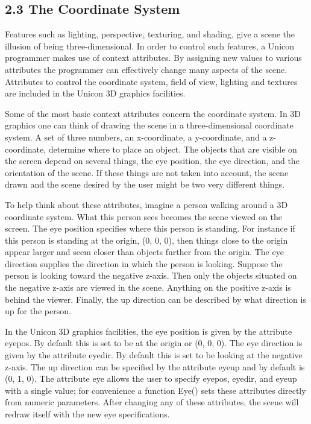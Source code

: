 \documentclass[letterpaper]{article}
\begin{document}
\subsection[2.3 The Coordinate System]
{2.3 The Coordinate System}

{
Features such as lighting, perspective, texturing, and shading, give a scene the illusion of being three-dimensional. In
order to control such features, a Unicon programmer makes use of context attributes. By assigning new values to various
attributes the programmer can effectively change many aspects of the scene. Attributes to control the coordinate
system, field of view, lighting and textures are included in the Unicon 3D graphics facilities. }

{
Some of the most basic context attributes concern the coordinate system. In 3D graphics one can think of drawing the
scene in a three-dimensional coordinate system. A set of three numbers, an x-coordinate, a y-coordinate, and a
z-coordinate, determine where to place an object. The objects that are visible on the screen depend on several things,
the eye position, the eye direction, and the orientation of the scene. If these things are not taken into account, the
scene drawn and the scene desired by the user might be two very different things. }

{
To help think about these attributes, imagine a person walking around a 3D coordinate system. What this person sees
becomes the scene viewed on the screen. The eye position specifies where this person is standing. For instance if this
person is standing at the origin, \textsf{(0, 0, 0),} then things close to the origin appear larger and seem closer
than objects further from the origin. The eye direction supplies the direction in which the person is looking. Suppose
the person is looking toward the negative z-axis. Then only the objects situated on the negative z-axis are viewed in
the scene. Anything on the positive z-axis is behind the viewer. Finally, the up direction can be described by what
direction is up for the person. }

{
In the Unicon 3D graphics facilities, the eye position is given by the attribute \textsf{eyepos}. By default this is set
to be at the origin or \textsf{(0, 0, 0)}. The eye direction is given by the attribute \textsf{eyedir}. By default this
is set to be looking at the negative z-axis. The up direction can be specified by the attribute \textsf{eyeup} and by
default is \textsf{(0, 1, 0)}. The attribute \textsf{eye} allows the user to specify \textsf{eyepos}, \textsf{eyedir},
and \textsf{eyeup} with a single value; for convenience a function \textsf{Eye()} sets these attributes directly from
numeric parameters. After changing any of these attributes, the scene will redraw itself with the new eye
specifications.}
\end{document}

